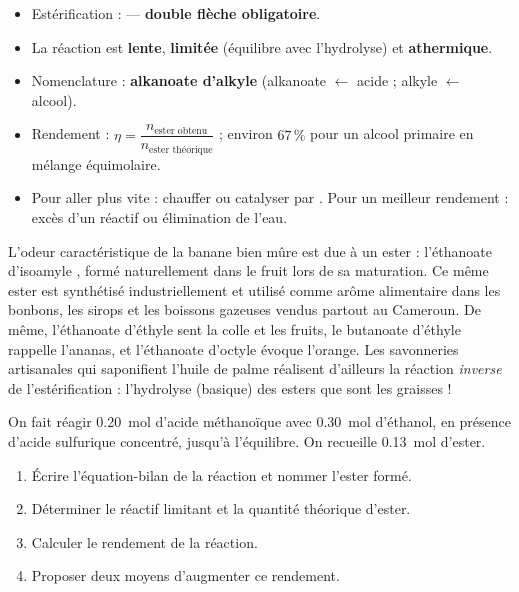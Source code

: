 \documentclass[11pt]{article}
\newcommand{\cle}[1]{{\popxbold\color{popdark}#1}}
\begin{document}
\begin{aretenir}
\begin{itemize}
\item Estérification :  — \textbf{double flèche obligatoire}.
\item La réaction est \textbf{lente}, \textbf{limitée} (équilibre avec l'hydrolyse) et \textbf{athermique}.
\item Nomenclature : \textbf{alkanoate d'alkyle} (alkanoate $\leftarrow$ acide ; alkyle $\leftarrow$ alcool).
\item Rendement : $\eta = \dfrac{n_{\text{ester obtenu}}}{n_{\text{ester théorique}}}$ ; environ $67\,\%$ pour un alcool primaire en mélange équimolaire.
\item Pour aller plus vite : chauffer ou catalyser par . Pour un meilleur rendement : excès d'un réactif ou élimination de l'eau.
\end{itemize}
\end{aretenir}

\begin{savaistu}
L'odeur caractéristique de la banane bien mûre est due à un ester : l'\cle{éthanoate d'isoamyle} , formé naturellement dans le fruit lors de sa maturation. Ce même ester est synthétisé industriellement et utilisé comme arôme alimentaire dans les bonbons, les sirops et les boissons gazeuses vendus partout au Cameroun. De même, l'éthanoate d'éthyle sent la colle et les fruits, le butanoate d'éthyle rappelle l'ananas, et l'éthanoate d'octyle évoque l'orange. Les savonneries artisanales qui saponifient l'huile de palme réalisent d'ailleurs la réaction \emph{inverse} de l'estérification : l'hydrolyse (basique) des esters que sont les graisses !
\end{savaistu}

\begin{exercice}
On fait réagir \SI{0,20}{mol} d'acide méthanoïque  avec \SI{0,30}{mol} d'éthanol, en présence d'acide sulfurique concentré, jusqu'à l'équilibre. On recueille \SI{0,13}{mol} d'ester.
\begin{enumerate}
\item Écrire l'équation-bilan de la réaction et nommer l'ester formé.
\item Déterminer le réactif limitant et la quantité théorique d'ester.
\item Calculer le rendement de la réaction.
\item Proposer deux moyens d'augmenter ce rendement.
\end{enumerate}
\end{exercice}
\end{document}
